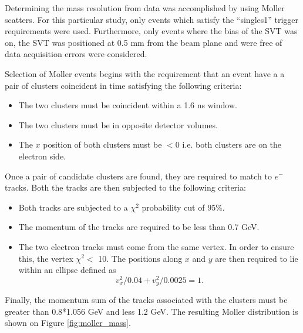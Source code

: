 Determining the mass resolution from data was accomplished by using Moller scatters.
For this particular study, only events which satisfy the ``singles1'' trigger 
requirements were used.  Furthermore, only events where the bias of the SVT was 
on, the SVT was positioned at 0.5 mm from the beam plane and were free of 
data acquisition errors were considered.

Selection of Moller events begins with the requirement that an event have a
a pair of clusters coincident in time satisfying the following criteria:
\begin{itemize}
    \item The two clusters must be coincident within a 1.6 ns window.
    \item The two clusters must be in opposite detector volumes.
    \item The $x$ position of both clusters must be $<0$ i.e. both clusters
          are on the electron side.
\end{itemize}
Once a pair of candidate clusters are found, they are required to match to 
$e^-$ tracks.  Both the tracks are then subjected to the following criteria:
\begin{itemize}
    \item Both tracks are subjected to a $\chi^{2}$ probability cut of 95\%.
    \item The momentum of the tracks are required to be less than 0.7 GeV.
    \item The two electron tracks must come from the same vertex.  In order to
          ensure this, the vertex $\chi^2 <$ 10. The positions along $x$ and $y$
          are then required to lie within an ellipse defined as
          \[
                v_x^2/0.04 + v_y^2/0.0025  = 1.
          \]
\end{itemize}
Finally, the momentum sum of the tracks associated with the clusters must be
greater than 0.8*1.056 GeV and less 1.2 GeV.  The resulting Moller distribution
is shown on Figure \ref{fig:moller_mass}. 

